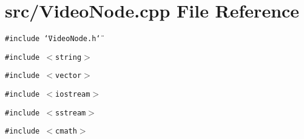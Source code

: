 \section{src/VideoNode.cpp File Reference}
\label{VideoNode_8cpp}
{\tt \#include \char`\"{}VideoNode.h\char`\"{}}\par
{\tt \#include $<$string$>$}\par
{\tt \#include $<$vector$>$}\par
{\tt \#include $<$iostream$>$}\par
{\tt \#include $<$sstream$>$}\par
{\tt \#include $<$cmath$>$}\par
